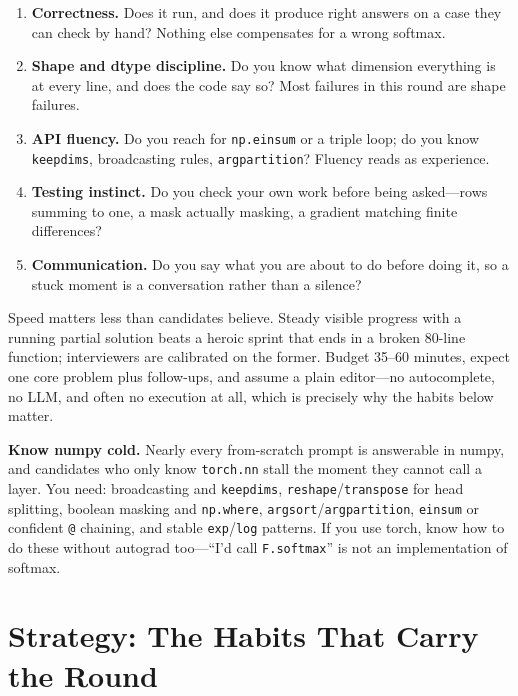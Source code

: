 \begin{enumerate}
    \item \textbf{Correctness.} Does it run, and does it produce right answers on a case they can check by hand? Nothing else compensates for a wrong softmax.
    \item \textbf{Shape and dtype discipline.} Do you know what dimension everything is at every line, and does the code say so? Most failures in this round are shape failures.
    \item \textbf{API fluency.} Do you reach for \texttt{np.einsum} or a triple loop; do you know \texttt{keepdims}, broadcasting rules, \texttt{argpartition}? Fluency reads as experience.
    \item \textbf{Testing instinct.} Do you check your own work before being asked---rows summing to one, a mask actually masking, a gradient matching finite differences?
    \item \textbf{Communication.} Do you say what you are about to do before doing it, so a stuck moment is a conversation rather than a silence?
\end{enumerate}

Speed matters less than candidates believe. Steady visible progress with a running partial solution beats a heroic sprint that ends in a broken 80-line function; interviewers are calibrated on the former. Budget 35--60 minutes, expect one core problem plus follow-ups, and assume a plain editor---no autocomplete, no LLM, and often no execution at all, which is precisely why the habits below matter.

\begin{warningbox}
\textbf{Know numpy cold.} Nearly every from-scratch prompt is answerable in numpy, and candidates who only know \texttt{torch.nn} stall the moment they cannot call a layer. You need: broadcasting and \texttt{keepdims}, \texttt{reshape}/\texttt{transpose} for head splitting, boolean masking and \texttt{np.where}, \texttt{argsort}/\texttt{argpartition}, \texttt{einsum} or confident \texttt{@} chaining, and stable \texttt{exp}/\texttt{log} patterns. If you use torch, know how to do these without autograd too---``I'd call \texttt{F.softmax}'' is not an implementation of softmax.
\end{warningbox}

\section{Strategy: The Habits That Carry the Round}
\label{sec:coding_strategy}

